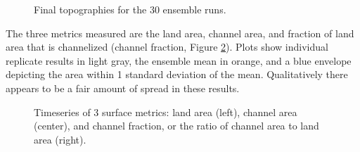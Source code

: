 \begin{figure}
	\caption{Final topographies for the 30 ensemble runs.}
	\label{fig:final_topos}
\end{figure}

The three metrics measured are the land area, channel area, and fraction of land area that is channelized (channel fraction, Figure \ref{fig:surface_metrics}). 
Plots show individual replicate results in light gray, the ensemble mean in orange, and a blue envelope depicting the area within 1 standard deviation of the mean. 
Qualitatively there appears to be a fair amount of spread in these results.

\begin{figure}
	\caption{Timeseries of 3 surface metrics: land area (left), channel area (center), and channel fraction, or the ratio of channel area to land area (right).}
	\label{fig:surface_metrics}
\end{figure}

